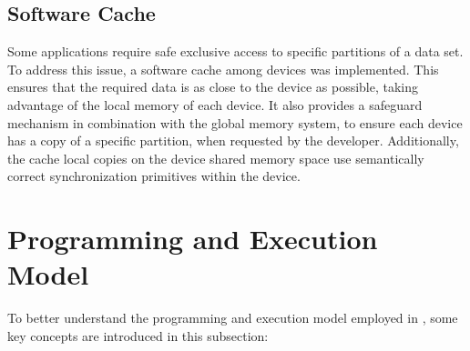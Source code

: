\documentclass[main.tex]{subfiles}
\begin{document}
\subsection{Software Cache}

Some applications require safe exclusive access to specific partitions of a data set. To address this issue, a software cache among devices was implemented. This ensures that the required data is as close to the device as possible, taking advantage of the local memory of each device. It also provides a safeguard mechanism in combination with the global memory system, to ensure each device has a copy of a specific partition, when requested by the developer. Additionally, the cache local copies on the device shared memory space use semantically correct synchronization primitives within the device.



\section{Programming and Execution Model}

To better understand the programming and execution model employed in \gama, some key concepts are introduced in this subsection:
\end{document}
